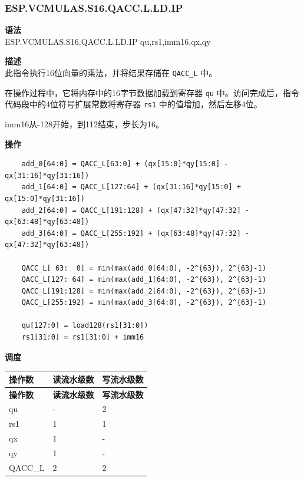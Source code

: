 \newpage
\subsubsection{ESP.VCMULAS.S16.QACC.L.LD.IP}\label{instruction:ESPVCMULASS16QACC_LLDIP}
\textbf{语法}\\
ESP.VCMULAS.S16.QACC.L.LD.IP qu,rs1,imm16,qx,qy

\textbf{描述}\\
此指令执行16位向量的乘法，并将结果存储在 \lstinline{QACC_L} 中。

在操作过程中，它将内存中的16字节数据加载到寄存器 \lstinline{qu} 中。访问完成后，指令代码段中的4位符号扩展常数将寄存器 \lstinline{rs1} 中的值增加，然后左移4位。

imm16从-128开始，到112结束，步长为16。

\textbf{操作}\\
\begin{lstlisting}
    add_0[64:0] = QACC_L[63:0] + (qx[15:0]*qy[15:0] - qx[31:16]*qy[31:16])
    add_1[64:0] = QACC_L[127:64] + (qx[31:16]*qy[15:0] + qx[15:0]*qy[31:16])
    add_2[64:0] = QACC_L[191:128] + (qx[47:32]*qy[47:32] - qx[63:48]*qy[63:48])
    add_3[64:0] = QACC_L[255:192] + (qx[63:48]*qy[47:32] - qx[47:32]*qy[63:48])

    QACC_L[ 63:  0] = min(max(add_0[64:0], -2^{63}), 2^{63}-1)
    QACC_L[127: 64] = min(max(add_1[64:0], -2^{63}), 2^{63}-1)
    QACC_L[191:128] = min(max(add_2[64:0], -2^{63}), 2^{63}-1)
    QACC_L[255:192] = min(max(add_3[64:0], -2^{63}), 2^{63}-1)

    qu[127:0] = load128(rs1[31:0])
    rs1[31:0] = rs1[31:0] + imm16
\end{lstlisting}

\textbf{调度}\\
\begin{longtable}[c]{|l|l|l|}
    \hline
    \rowcolor{lightgray}
    \textbf{操作数} & \textbf{读流水级数} & \textbf{写流水级数} \\\hline
    \endfirsthead
    \hline
    \rowcolor{lightgray}
     \textbf{操作数} & \textbf{读流水级数} & \textbf{写流水级数} \\\hline
    \endhead
    \hline
    \endfoot

    qu & - & 2 \\\hline
    rs1 & 1 & 1 \\\hline
     qx & 1 & - \\\hline
     qy & 1 & - \\\hline
     QACC\_L & 2 & 2

\end{longtable}


